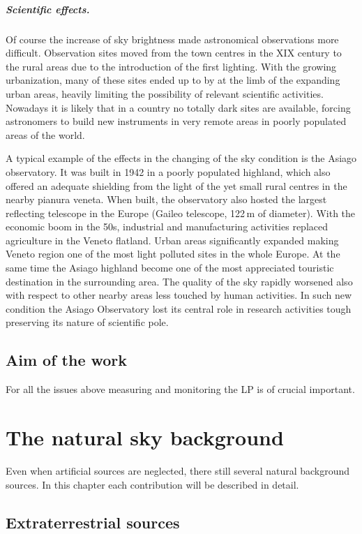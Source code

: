 \documentclass{book}
\begin{document}
\paragraph{Scientific effects.} Of course the increase of sky brightness made astronomical observations more difficult. Observation sites moved from the town centres in the XIX century to the rural areas due to the introduction of the first lighting. With the growing urbanization, many of these sites ended up to by at the limb of the expanding urban areas, heavily limiting the possibility of relevant scientific activities. Nowadays it is likely that in a country no totally dark sites are available, forcing astronomers to build new instruments in very remote areas in poorly populated areas of the world.

A typical example of the effects in the changing of the sky condition is the Asiago observatory. It was built in 1942 in a poorly populated highland, which also offered an adequate shielding from the light of the yet small rural centres in the nearby pianura veneta. When built, the observatory also hosted the largest reflecting telescope in the Europe (Gaileo telescope, 122\,m of diameter).
With the economic boom in the 50s, industrial and manufacturing activities replaced agriculture in the Veneto flatland. Urban areas significantly expanded making Veneto region one of the most light polluted sites in the whole Europe. At the same time the Asiago highland become one of the most appreciated touristic destination in the surrounding area. The quality of the sky rapidly worsened also with respect to other nearby areas less touched by human activities. In such new condition the Asiago Observatory lost its central role in research activities tough preserving its nature of scientific pole.

\section{Aim of the work}
For all the issues above measuring and monitoring the LP is of crucial important. 

\chapter{The natural sky background}
Even when artificial sources are neglected, there still several natural background sources. In this chapter each contribution will be described in detail.

\section{Extraterrestrial sources}
\end{document}
